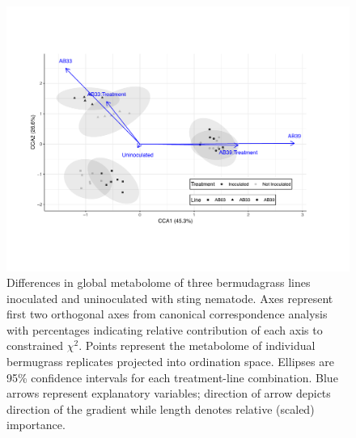 \documentclass[9pt,lineno]{elife}
\begin{document}
\begin{figure}
\begin{fullwidth}
\includegraphics[width=0.95\linewidth]{figures/publication_figures/figure-2.pdf}
\caption{Differences in global metabolome of three bermudagrass lines inoculated and uninoculated with sting nematode.  Axes represent first two orthogonal axes from canonical correspondence analysis with percentages indicating relative contribution of each axis to constrained $\chi^2$.  Points represent the metabolome of individual bermugrass replicates projected into ordination space.  Ellipses are 95\% confidence intervals for each treatment-line combination.  Blue arrows represent explanatory variables; direction of arrow depicts direction of the gradient while length denotes relative (scaled) importance.  }
\label{fig:figure2}
\end{fullwidth}
\end{figure}
\end{document}
